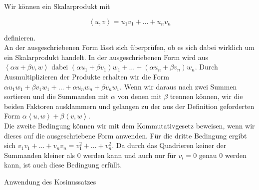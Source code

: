Wir können ein Skalarprodukt mit

\begin{equation*}
\left\langle u,v\right\rangle  = u_1 v_1 + \dots + u_n v_n
\end{equation*}

definieren.\\An der ausgeschriebenen Form lässt sich überprüfen, ob es sich dabei wirklich um ein Skalarprodukt handelt. In der ausgeschriebenen Form wird aus $\left\langle \alpha u + \beta v, w\right\rangle $ dabei $(\alpha u_1 + \beta v_1) w_1 + \dots + (\alpha u_n + \beta v_n) w_n$. Durch Ausmultiplizieren der Produkte erhalten wir die Form $\alpha u_1 w_1 + \beta v_1 w_1 + \dots + \alpha u_n w_n +\beta v_n w_v$. Wenn wir daraus nach zwei Summen sortieren und die Summanden mit $\alpha$ von denen mit $\beta$ trennen können, wir die beiden Faktoren ausklammern und gelangen zu der aus der Definition geforderten Form $\alpha \left\langle u,w\right\rangle  + \beta \left\langle v,w\right\rangle $.\\
Die zweite Bedingung können wir mit dem Kommutativgesetz beweisen, wenn wir dieses auf die ausgeschriebene Form anwenden.
Für die dritte Bedingung ergibt sich $v_1 v_1 + \dots + v_n v_n = v_1^2 + \dots + v_n^2$. Da durch das Quadrieren keiner der Summanden kleiner als 0 werden kann und auch nur für $v_i = 0$ genau 0 werden kann, ist auch diese Bedingung erfüllt.\\

\begin{dsafigure}
\centering
{}
\caption {Anwendung des Kosinussatzes}
\label{Kosinussatz}
\end{dsafigure}

